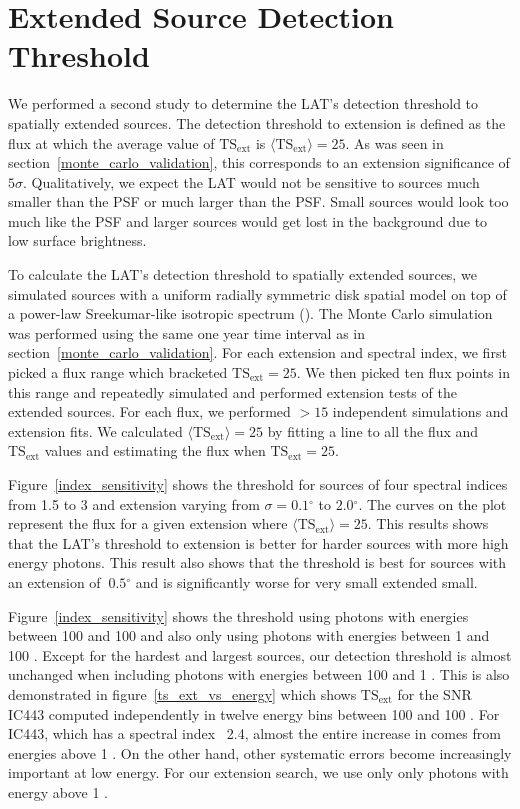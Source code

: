\documentclass[12pt,preprint]{aastex}
\newcommand{\mev}{\text{MeV}\xspace}
\newcommand{\gev}{\text{GeV}\xspace}
\newcommand{\tsext}{{\ensuremath{\text{TS}_\text{ext}}}\xspace}
\newcommand{\ts}{\text{TS}\xspace}
\renewcommand{\deg}{\ensuremath{^\circ}\xspace}
\begin{document}
\section{Extended Source Detection Threshold}\label{extension_sensitivity}

We performed a second study to determine the LAT's detection
threshold to spatially extended sources. The detection threshold
to extension is defined as the flux at which the average
value of $\tsext$ is $\langle\tsext\rangle=25$. As was seen in
section~\ref{monte_carlo_validation}, this corresponds to an extension
significance of $5\sigma$.  Qualitatively, we expect the LAT would not
be sensitive to sources much smaller than the PSF or much larger than
the PSF.  Small sources would look too much like the PSF and larger
sources would get lost in the background due to low surface brightness.

To calculate the LAT's detection threshold to spatially extended
sources, we simulated sources with a uniform radially symmetric disk
spatial model on top of a power-law Sreekumar-like isotropic spectrum
(\cite{sreekumar_isotropic}).  The Monte Carlo simulation was performed
using the same one year time interval as in section~\ref{monte_carlo_validation}.
For each extension and spectral index, we
first picked a flux range which bracketed $\tsext=25$. We then picked
ten flux points in this range and repeatedly simulated and performed
extension tests of the extended sources.  For each flux, we performed
$>15$ independent simulations and extension fits.  We calculated
$\langle\tsext\rangle=25$ by fitting a line to all the flux and
$\tsext$ values and estimating the flux when $\tsext=25$.

Figure~\ref{index_sensitivity} shows the threshold for sources of four
spectral indices from 1.5 to 3 and extension varying from $\sigma=0.1\deg$
to $2.0\deg$.  The curves on the plot represent the flux for a given
extension where $\langle\tsext\rangle=25$. 
This results shows that the LAT's threshold to extension is better for
harder sources with more high energy photons. This result also shows
that the threshold is best for sources with an extension of $~0.5\deg$
and is significantly worse for very small extended small.

Figure~\ref{index_sensitivity} shows the threshold using photons with
energies between 100 \mev and 100 \gev and also only using photons
with energies between 1 \gev and 100 \gev.  Except for the hardest
and largest sources, our detection threshold is almost unchanged when
including photons with energies between 100 \mev and 1 \gev.  This is also
demonstrated in figure~\ref{ts_ext_vs_energy} which shows \tsext for the
SNR IC443 computed independently in twelve energy bins between 100 \mev and
100 \gev. For IC443, which has a spectral index ~2.4, almost the entire
increase in \ts comes from energies above 1 \gev.  On the other hand,
other systematic errors become increasingly important at low energy. For
our extension search, we use only only photons with energy above 1 \gev.
\end{document}
